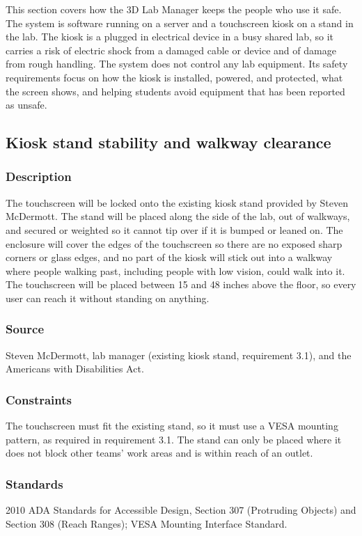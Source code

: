 This section covers how the 3D Lab Manager keeps the people who use it safe. The system is software running on a server and a touchscreen kiosk on a stand in the lab. The kiosk is a plugged in electrical device in a busy shared lab, so it carries a risk of electric shock from a damaged cable or device and of damage from rough handling. The system does not control any lab equipment. Its safety requirements focus on how the kiosk is installed, powered, and protected, what the screen shows, and helping students avoid equipment that has been reported as unsafe.

\subsection{Kiosk stand stability and walkway clearance}
\subsubsection{Description}
The touchscreen will be locked onto the existing kiosk stand provided by Steven McDermott. The stand will be placed along the side of the lab, out of walkways, and secured or weighted so it cannot tip over if it is bumped or leaned on. The enclosure will cover the edges of the touchscreen so there are no exposed sharp corners or glass edges, and no part of the kiosk will stick out into a walkway where people walking past, including people with low vision, could walk into it. The touchscreen will be placed between 15 and 48 inches above the floor, so every user can reach it without standing on anything.
\subsubsection{Source}
Steven McDermott, lab manager (existing kiosk stand, requirement 3.1), and the Americans with Disabilities Act.
\subsubsection{Constraints}
The touchscreen must fit the existing stand, so it must use a VESA mounting pattern, as required in requirement 3.1. The stand can only be placed where it does not block other teams' work areas and is within reach of an outlet.
\subsubsection{Standards}
2010 ADA Standards for Accessible Design, Section 307 (Protruding Objects) and Section 308 (Reach Ranges); VESA Mounting Interface Standard.
